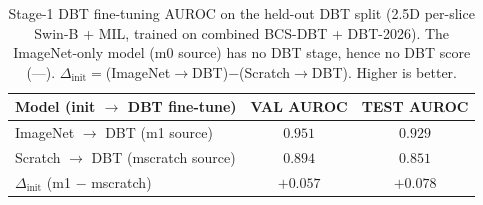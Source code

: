 \documentclass{article}
\begin{document}
\begin{table}[t]
  \centering
  \caption{Stage-1 DBT fine-tuning AUROC on the held-out DBT split
  (2.5D per-slice Swin-B + MIL, trained on combined BCS-DBT + DBT-2026).
  The ImageNet-only model (m0 source) has no DBT stage, hence no DBT score (---).
  $\Delta_{\mathrm{init}}=$(ImageNet$\rightarrow$DBT)$-$(Scratch$\rightarrow$DBT). Higher is better.}
  \label{tab:finetune_dbt}
  \begin{tabular}{lcc}
    \toprule
    Model (init $\rightarrow$ DBT fine-tune) & VAL AUROC & TEST AUROC \\
    \midrule
    ImageNet $\rightarrow$ DBT (m1 source)      & $\mathbf{0.951}$ & $\mathbf{0.929}$ \\
    Scratch $\rightarrow$ DBT (mscratch source) & $0.894$ & $0.851$ \\
    \midrule
    $\Delta_{\mathrm{init}}$ (m1 $-$ mscratch)  & $+0.057$ & $+0.078$ \\
    \bottomrule
  \end{tabular}
\end{table}
\end{document}
